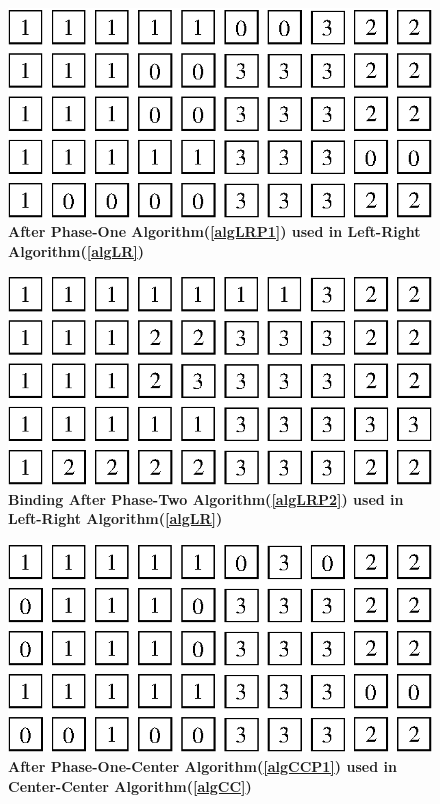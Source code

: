 \documentclass[10pt, conference]{IEEEtran}
\begin{document}
\begin{figure} [tb]
\centering
\includegraphics[scale=0.45]{figure/phase_one_left_right.eps}
\caption{\textbf{After Phase-One Algorithm(\ref{algLRP1}) used in Left-Right Algorithm(\ref{algLR}) }}
\label{imgLRP1}
\end{figure}

\begin{figure} [tb]
\centering
\includegraphics[scale=0.45]{figure/phase_two_left_right.eps}
\caption{\textbf{Binding After Phase-Two Algorithm(\ref{algLRP2}) used in Left-Right Algorithm(\ref{algLR}) }}
\label{imgLRP2}
\end{figure}

\begin{figure} [tb]
\centering
\includegraphics[scale=0.45]{figure/phase_one_center_center.eps}
\caption{\textbf{After Phase-One-Center Algorithm(\ref{algCCP1}) used in Center-Center Algorithm(\ref{algCC}) }}
\label{imgCCP1}
\end{figure}
\end{document}
